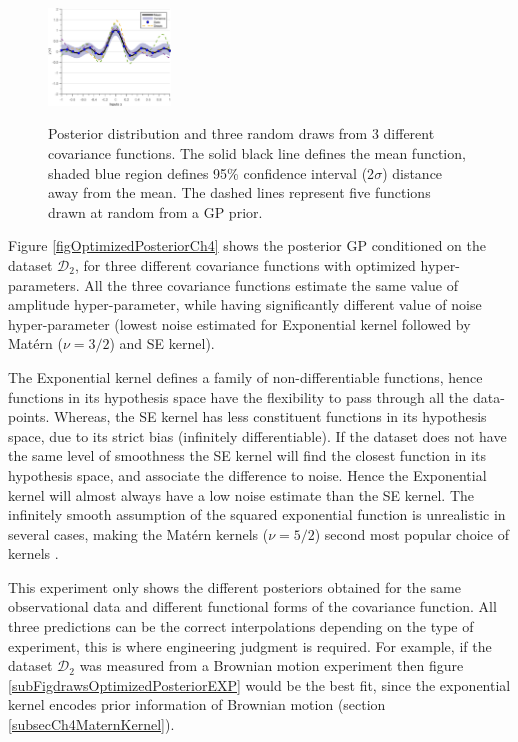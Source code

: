\begin{figure}[!ht]
  {
        \includegraphics[width=0.29\textwidth]
        {images/part2/drawsPosteriorSE}
        \label{subFigdrawsPosteriorSE}
  }\quad
\caption{Posterior distribution and three random draws from 3 different covariance functions. The solid black line defines the mean function, shaded blue region defines 95\% confidence interval (2$\sigma$) distance away from the mean. The dashed lines represent five functions drawn at random from a GP prior. }
       \label{figpreOptimizedPosteriorCh5}
\end{figure}

\begin{mdframed}[hidealllines=true,backgroundcolor=lightgray!20]
Figure \ref{figOptimizedPosteriorCh4} shows the posterior GP conditioned on the dataset $\mathcal{D}_{2}$, for three different covariance functions with optimized hyper-parameters. All the three covariance functions estimate the same value of amplitude hyper-parameter, while having significantly different value of noise hyper-parameter (lowest noise estimated for Exponential kernel followed by Mat\'ern ($\nu=3/2$) and SE kernel). 

The Exponential kernel defines a family of non-differentiable functions, hence functions in its hypothesis space have the flexibility to pass through all the data-points. Whereas, the SE kernel has less  constituent functions in its hypothesis space, due to its strict bias (infinitely differentiable). If the dataset does not have the same level of smoothness the SE kernel will find the closest function in its hypothesis space, and associate the difference to noise. Hence the Exponential kernel will almost always have a low noise estimate than the SE kernel. The infinitely smooth assumption of the squared exponential function is unrealistic in several cases, making the Mat\'ern kernels ($\nu=5/2$) second most popular choice of kernels \cite{stein2012interpolation, cornford2002modelling}. 

This experiment only shows the different posteriors obtained for the same observational data and different functional forms of the covariance function. All three predictions can be the correct interpolations depending on the type of experiment, this is where engineering judgment is required. For example, if the dataset $\mathcal{D}_{2}$ was measured from a Brownian motion experiment then figure \ref{subFigdrawsOptimizedPosteriorEXP} would be the best fit, since the exponential kernel encodes prior information of Brownian motion (section \ref{subsecCh4MaternKernel}).

\end{mdframed}

